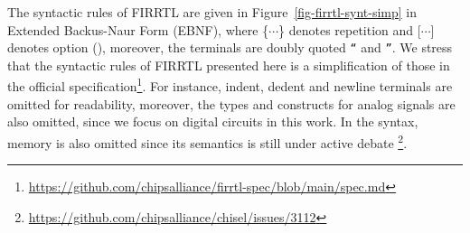 The syntactic rules of FIRRTL are given in Figure~\ref{fig-firrtl-synt-simp} in Extended Backus-Naur Form (EBNF), where \{$\cdots$\} denotes repetition 
and [$\cdots$] denotes option (), moreover, the terminals are doubly quoted \mbox{\tt ``} and \mbox{\tt ''}. We stress that the syntactic rules of FIRRTL presented here is a simplification of those in the official specification\footnote{\url{https://github.com/chipsalliance/firrtl-spec/blob/main/spec.md}}. For instance, indent, dedent and newline terminals are omitted for readability, moreover, the types and constructs for analog signals are also omitted, since we focus on digital circuits in this work. In the syntax, memory is also omitted since its semantics is still under active debate \footnote{\url{https://github.com/chipsalliance/chisel/issues/3112}}.

